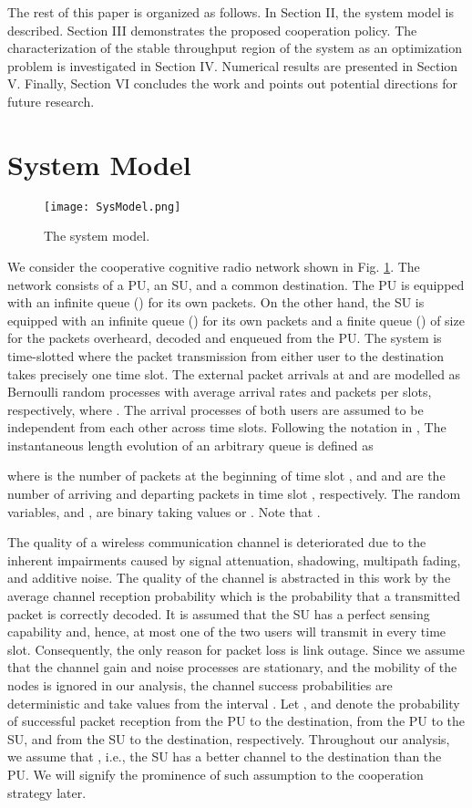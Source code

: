 \documentclass[conference]{IEEEtran}
\begin{document}
The rest of this paper is organized as follows. In Section II,
the system model is described. Section III demonstrates the proposed
cooperation policy. The characterization of the stable
throughput region of the system as an optimization problem is investigated
in Section IV. Numerical results are presented in Section V.
Finally, Section VI concludes the work and points out potential 
directions for future research.

\section{System Model}
\begin{figure}
\centering
\texttt{[image: SysModel.png]}
\caption{The system model.}
\label{fig:SysModel}
\end{figure}
We consider the cooperative cognitive radio network shown in Fig.
\ref{fig:SysModel}. The network consists of a PU, an SU, and a
common destination. The PU is equipped with an infinite queue
() for its own packets. On the other hand, the SU is equipped
with an infinite queue () for its own packets and a finite
queue () of size  for the packets overheard, decoded and enqueued from the PU.
The system is time-slotted where the packet transmission from
either user to the destination takes precisely one time slot. The
external packet arrivals at  and  are modelled as
Bernoulli random processes with average arrival rates  and 
packets per slots, respectively, where .
The arrival processes of both users are assumed to
be independent from each other across time slots. Following the notation in 
\cite{Ashour_Journal}, The instantaneous length evolution of an arbitrary 
queue  is defined as

where  is the number of packets at the beginning of 
time slot , and  and  are the number
of arriving and departing packets in time slot , respectively. 
The random variables,  and , are binary taking 
values  or . Note that .

The quality of a wireless communication channel is deteriorated
due to the inherent impairments caused by signal
attenuation, shadowing, multipath fading, and additive noise. The
quality of the channel is abstracted in this work by the average channel
reception probability which is the probability that a transmitted
packet is correctly decoded. It is assumed that the SU 
has a perfect sensing capability and, hence, at
most one of the two users will transmit in every time slot.
Consequently, the only reason for packet loss is link
outage. Since we assume that the channel gain and 
noise processes are stationary, and the mobility of the nodes is
ignored in our analysis, the channel success probabilities are
deterministic and take values from the interval . Let
,  and   denote the probability of
successful packet reception from the PU to the destination, from
the PU to the SU, and from the SU to the destination,
respectively. Throughout our analysis, we assume that , i.e., the SU has a better channel to the destination than
the PU. We will signify the prominence of such assumption to the
cooperation strategy later.
\end{document}
